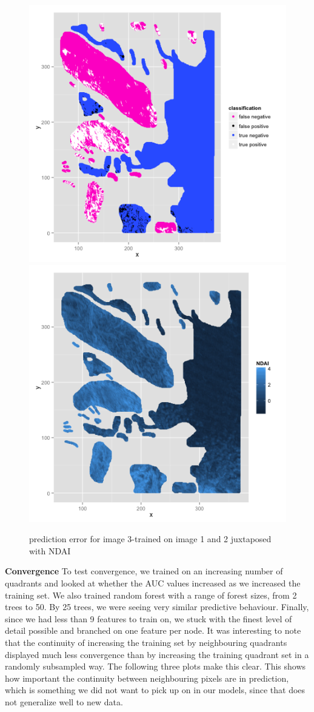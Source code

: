 \documentclass{article}\usepackage[]{graphicx}\usepackage[]{color}
\begin{document}
  \begin{figure}[H]
  \includegraphics[width=\linewidth, height = 170pts ]{classification_image3.png}
\endminipage\hfill
{}
  \includegraphics[width=\linewidth, height = 170pts]{NDAI_image3.png}
\endminipage\hfill
\caption{prediction error for image 3-trained on image 1 and 2 juxtaposed with NDAI}
\end{figure}

{\bf Convergence} 
 To test convergence, we trained on an increasing number of quadrants and looked at whether the AUC values increased as we increased the training set.  We also trained random forest with a range of forest sizes, from 2 trees to 50. By 25 trees, we were seeing very similar predictive behaviour.  Finally, since we had less than 9 features to train on, we stuck with the finest level of detail possible and branched on one feature per node. It was interesting to note that the continuity of increasing the training set by neighbouring quadrants displayed much less convergence than by increasing the training quadrant set in a randomly subsampled way.  The following three plots make this clear.  This shows how important the continuity between neighbouring pixels are in prediction, which is something we did not want to pick up on in our models, since that does not generalize well to new data.  \\
\end{document}
